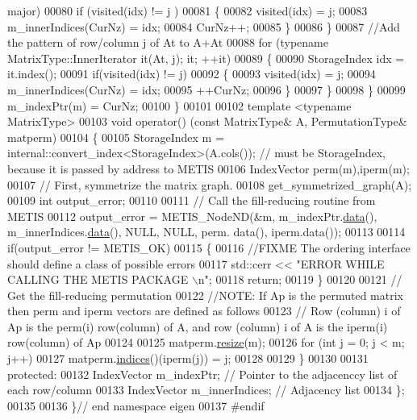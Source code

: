 \begin{DoxyCode}
{       major)}
00080         \textcolor{keywordflow}{if} (visited(idx) != j ) 
00081         \{
00082           visited(idx) = j; 
00083           m\_innerIndices(CurNz) = idx; 
00084           CurNz++; 
00085         \}
00086       \}
00087       \textcolor{comment}{//Add the pattern of row/column j of At to A+At}
00088       \textcolor{keywordflow}{for} (\textcolor{keyword}{typename} MatrixType::InnerIterator it(At, j); it; ++it)
00089       \{
00090         StorageIndex idx = it.index(); 
00091         \textcolor{keywordflow}{if}(visited(idx) != j)
00092         \{
00093           visited(idx) = j; 
00094           m\_innerIndices(CurNz) = idx; 
00095           ++CurNz; 
00096         \}
00097       \}
00098     \}
00099     m\_indexPtr(m) = CurNz;    
00100   \}
00101   
00102   \textcolor{keyword}{template} <\textcolor{keyword}{typename} MatrixType>
00103   \textcolor{keywordtype}{void} operator() (\textcolor{keyword}{const} MatrixType& A, PermutationType& matperm)
00104   \{
00105      StorageIndex m = internal::convert\_index<StorageIndex>(A.cols()); \textcolor{comment}{// must be StorageIndex, because it
       is passed by address to METIS}
00106      IndexVector perm(m),iperm(m); 
00107     \textcolor{comment}{// First, symmetrize the matrix graph. }
00108      get\_symmetrized\_graph(A); 
00109      \textcolor{keywordtype}{int} output\_error;
00110      
00111      \textcolor{comment}{// Call the fill-reducing routine from METIS }
00112      output\_error = METIS\_NodeND(&m, m\_indexPtr.\hyperlink{class_eigen_1_1_plain_object_base_ac25699535374b1854cf8494e44ad31b2}{data}(), m\_innerIndices.\hyperlink{class_eigen_1_1_plain_object_base_ac25699535374b1854cf8494e44ad31b2}{data}(), NULL, NULL, perm.
      data(), iperm.data());
00113      
00114     \textcolor{keywordflow}{if}(output\_error != METIS\_OK) 
00115     \{
00116       \textcolor{comment}{//FIXME The ordering interface should define a class of possible errors }
00117      std::cerr << \textcolor{stringliteral}{"ERROR WHILE CALLING THE METIS PACKAGE \(\backslash\)n"}; 
00118      \textcolor{keywordflow}{return}; 
00119     \}
00120     
00121     \textcolor{comment}{// Get the fill-reducing permutation }
00122     \textcolor{comment}{//NOTE:  If Ap is the permuted matrix then perm and iperm vectors are defined as follows }
00123     \textcolor{comment}{// Row (column) i of Ap is the perm(i) row(column) of A, and row (column) i of A is the iperm(i)
       row(column) of Ap}
00124     
00125      matperm.\hyperlink{group___core___module_a0e0fda6e84d69e02432e4770359bb532}{resize}(m);
00126      \textcolor{keywordflow}{for} (\textcolor{keywordtype}{int} j = 0; j < m; j++)
00127        matperm.\hyperlink{group___core___module_a2f1ab379207fcd1ceb33941e25cf50c2}{indices}()(iperm(j)) = j;
00128    
00129   \}
00130   
00131   \textcolor{keyword}{protected}:
00132     IndexVector m\_indexPtr; \textcolor{comment}{// Pointer to the adjacenccy list of each row/column}
00133     IndexVector m\_innerIndices; \textcolor{comment}{// Adjacency list }
00134 \};
00135 
00136 \}\textcolor{comment}{// end namespace eigen }
00137 \textcolor{preprocessor}{#endif}
\end{DoxyCode}
